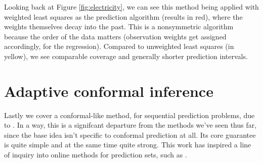\documentclass{article}
\begin{document}
Looking back at Figure \ref{fig:electricity}, we can see this method being
applied with weighted least squares as the prediction algorithm (results in
red), where the weights themselves decay into the past. This is a nonsymmetric
algorithm because the order of the data matters (observation weights get
assigned accordingly, for  the regression). Compared to unweighted least squares
(in yellow), we see comparable coverage and generally shorter prediction
intervals. 

\section{Adaptive conformal inference}

\def\err{\mathrm{err}}

Lastly we cover a conformal-like method, for sequential prediction problems, due 
to \citet{gibbs2021adaptive}. In a way, this is a signifcant departure from the
methods we've seen thus far, since the base idea isn't specific to conformal
prediction at all. Its core guarantee is quite simple and at the same time quite
strong. This work has inspired a line of inquiry into online methods for
prediction sets, such as \citet{gibbs2022conformal, zaffran2022adaptive,
  bhatnagar2023improved, angelopoulos2023conformal}.
\end{document}
